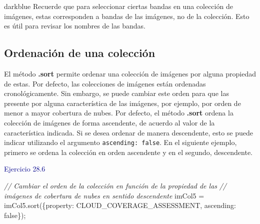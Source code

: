 \documentclass[
  12pt,
  letterpaper,
  twoside]{book}
\newenvironment{Shaded}{\begin{snugshade}}{\end{snugshade}}
\newcommand{\CommentTok}[1]{\textcolor[rgb]{0.24,0.58,0.00}{\textit{#1}}}
\newcommand{\DataTypeTok}[1]{\textcolor[rgb]{0.00,0.00,0.00}{#1}}
\newcommand{\FunctionTok}[1]{\textcolor[rgb]{0.48,0.12,0.64}{#1}}
\newcommand{\KeywordTok}[1]{\textcolor[rgb]{0.48,0.12,0.64}{#1}}
\newcommand{\NormalTok}[1]{#1}
\newcommand{\OperatorTok}[1]{\textcolor[rgb]{0.00,0.00,0.00}{#1}}
\newcommand{\StringTok}[1]{\textcolor[rgb]{0.87,0.29,0.22}{#1}}
\newcommand\boldpurple[1]{\textcolor{darkpurple}{\textbf{#1}}}
\begin{document}
\begin{bluebox2}

\begin{awesomeblock}{5pt}{\faLightbulb}{darkblue}
Recuerde que para seleccionar ciertas bandas en una colección de imágenes, estas corresponden a bandas de las imágenes, no de la colección. Esto es útil para revisar los nombres de las bandas.

\end{awesomeblock}

\end{bluebox2}

\hypertarget{ordenaciuxf3n-de-una-colecciuxf3n}{%
\subsection*{Ordenación de una colección}\label{ordenaciuxf3n-de-una-colecciuxf3n}}

El método \boldpurple{.sort} permite ordenar una colección de imágenes por alguna propiedad de estas. Por defecto, las colecciones de imágenes están ordenadas cronológicamente. Sin embargo, se puede cambiar este orden para que las presente por alguna característica de las imágenes, por ejemplo, por orden de menor a mayor cobertura de nubes. Por defecto, el método \boldpurple{.sort} ordena la colección de imágenes de forma ascendente, de acuerdo al valor de la característica indicada. Si se desea ordenar de manera descendente, esto se puede indicar utilizando el argumento \texttt{ascending:\ false}. En el siguiente ejemplo, primero se ordena la colección en orden ascendente y en el segundo, descendente.

\textcolor{darkblue}{Ejercicio 28.6}

\begin{Shaded}
\begin{Highlighting}[]
\CommentTok{// Cambiar el orden de la colección en función de la propiedad de las }
\CommentTok{// imágenes de cobertura de nubes en sentido descendente}
\NormalTok{imCol5 }\OperatorTok{=}\NormalTok{ imCol5}\OperatorTok{.}\FunctionTok{sort}\NormalTok{(\{}\DataTypeTok{property}\OperatorTok{:} \StringTok{\textquotesingle{}CLOUD\_COVERAGE\_ASSESSMENT\textquotesingle{}}\OperatorTok{,} 
  \DataTypeTok{ascending}\OperatorTok{:} \KeywordTok{false}\NormalTok{\})}\OperatorTok{;}
\end{Highlighting}
\end{Shaded}
\end{document}
